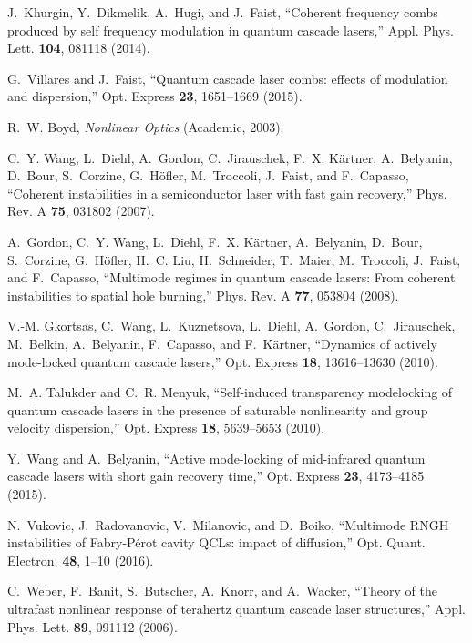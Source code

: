 \documentclass[10pt]{article}
\begin{document}
\begin{thebibliography}{10}
	J.~Khurgin, Y.~Dikmelik, A.~Hugi, and J.~Faist, \enquote{Coherent frequency
		combs produced by self frequency modulation in quantum cascade lasers,} Appl.
	Phys. Lett. \textbf{104}, 081118 (2014).
	
	G.~Villares and J.~Faist, \enquote{Quantum cascade laser combs: effects of
		modulation and dispersion,} Opt. Express \textbf{23}, 1651--1669 (2015).
	
	R.~W. Boyd, \emph{{Nonlinear Optics}} (Academic, 2003).
	
	C.~Y. Wang, L.~Diehl, A.~Gordon, C.~Jirauschek, F.~X. K\"artner, A.~Belyanin,
	D.~Bour, S.~Corzine, G.~H\"ofler, M.~Troccoli, J.~Faist, and F.~Capasso,
	\enquote{Coherent instabilities in a semiconductor laser with fast gain
		recovery,} Phys. Rev. A \textbf{75}, 031802 (2007).
	
	A.~Gordon, C.~Y. Wang, L.~Diehl, F.~X. K\"artner, A.~Belyanin, D.~Bour,
	S.~Corzine, G.~H\"ofler, H.~C. Liu, H.~Schneider, T.~Maier, M.~Troccoli,
	J.~Faist, and F.~Capasso, \enquote{Multimode regimes in quantum cascade
		lasers: From coherent instabilities to spatial hole burning,} Phys. Rev. A
	\textbf{77}, 053804 (2008).
	
	V.-M. Gkortsas, C.~Wang, L.~Kuznetsova, L.~Diehl, A.~Gordon, C.~Jirauschek,
	M.~Belkin, A.~Belyanin, F.~Capasso, and F.~K{\"a}rtner, \enquote{Dynamics of
		actively mode-locked quantum cascade lasers,} Opt. Express \textbf{18},
	13616--13630 (2010).
	
	M.~A. Talukder and C.~R. Menyuk, \enquote{Self-induced transparency modelocking
		of quantum cascade lasers in the presence of saturable nonlinearity and group
		velocity dispersion,} Opt. Express \textbf{18}, 5639--5653 (2010).
	
	Y.~Wang and A.~Belyanin, \enquote{Active mode-locking of mid-infrared quantum
		cascade lasers with short gain recovery time,} Opt. Express \textbf{23},
	4173--4185 (2015).
	
	N.~Vukovic, J.~Radovanovic, V.~Milanovic, and D.~Boiko, \enquote{{Multimode
			RNGH instabilities of Fabry-P{\'e}rot cavity QCLs: impact of diffusion},}
	Opt. Quant. Electron. \textbf{48}, 1--10 (2016).
	
	C.~Weber, F.~Banit, S.~Butscher, A.~Knorr, and A.~Wacker, \enquote{Theory of
		the ultrafast nonlinear response of terahertz quantum cascade laser
		structures,} Appl. Phys. Lett. \textbf{89}, 091112 (2006).
	

\end{thebibliography}
\end{document}
